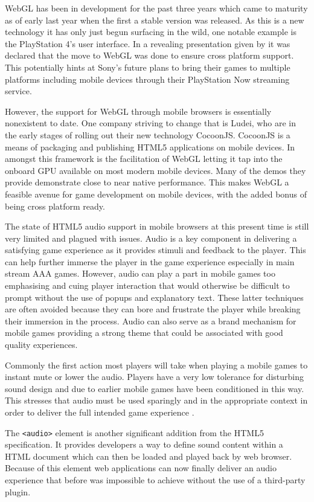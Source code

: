 \documentclass[final]{cmpreport}
\begin{document}
WebGL has been in development for the past three years which came to maturity as of early last year when the first a stable version was released. As this is a new technology it has only just begun surfacing in the wild, one notable example is the PlayStation 4's user interface. In a revealing presentation given by \cite{Olmstead} it was declared that the move to WebGL was done to ensure cross platform support. This potentially hints at Sony's future plans to bring their games to multiple platforms including mobile devices through their PlayStation Now streaming service.

However, the support for WebGL through mobile browsers is essentially nonexistent to date. One company striving to change that is Ludei, who are in the early stages of rolling out their new technology CocoonJS. CocoonJS is a means of packaging and publishing HTML5 applications on mobile devices. In amongst this framework is the facilitation of WebGL letting it tap into the onboard GPU available on most modern mobile devices. Many of the demos they provide demonstrate close to near native performance. This makes WebGL a feasible avenue for game development on mobile devices, with the added bonus of being cross platform ready.

The state of HTML5 audio support in mobile browsers at this present time is still very limited and plagued with issues. Audio is a key component in delivering a satisfying game experience as it provides stimuli and feedback to the player. This can help further immerse the player in the game experience especially in main stream AAA games. However, audio can play a part in mobile games too emphasising and cuing player interaction that would otherwise be difficult to prompt without the use of popups and explanatory text. These latter techniques are often avoided because they can bore and frustrate the player while breaking their immersion in the process. Audio can also serve as a brand mechanism for mobile games providing a strong theme that could be associated with good quality experiences.

Commonly the first action most players will take when playing a mobile games to instant mute or lower the audio. Players have a very low tolerance for disturbing sound design and due to earlier mobile games have been conditioned in this way. This stresses that audio must be used sparingly and in the appropriate context in order to deliver the full intended game experience \cite{Thomas}.

The \texttt{<audio>} element is another significant addition from the HTML5 specification. It provides developers a way to define sound content within a HTML document which can then be loaded and played back by web browser. Because of this element web applications can now finally deliver an audio experience that before was impossible to achieve without the use of a third-party plugin.
\end{document}
